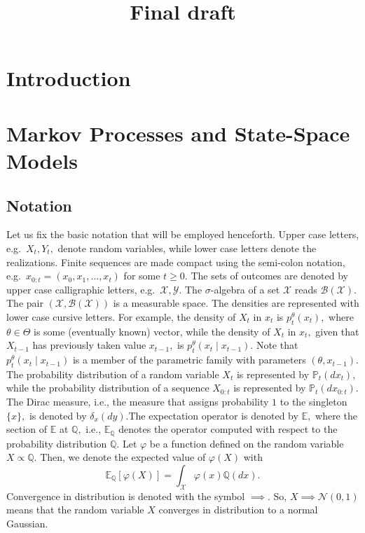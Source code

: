 \documentclass[
]{book}
\title{Final draft}
\author{}
\date{\vspace{-2.5em}}
\theoremstyle{break}
\theoremstyle{nonumberplain}
\begin{document}
\frontmatter
\maketitle

\mainmatter
\chapter*{Introduction}

\chapter{Markov Processes and State-Space Models}
\section{Notation}

Let us fix the basic notation that will be employed henceforth. Upper
case letters, e.g.~\(X_t, Y_t,\) denote random variables, while lower
case letters denote the realizations. Finite sequences are made compact
using the semi-colon notation, e.g.~\(x_{0:t}=(x_0, x_1, \dots, x_t)\)
for some \(t \geq 0.\) The sets of outcomes are denoted by upper case
calligraphic letters, e.g.~\(\mathcal{X}, \mathcal{Y}.\) The
\(\sigma\)-algebra of a set \(\mathcal{X}\) reads
\(\mathcal{B}(\mathcal{X}).\) The pair
\((\mathcal{X}, \mathcal{B}(\mathcal{X}))\) is a measurable space. The
densities are represented with lower case cursive letters. For example,
the density of \(X_t\) in \(x_t\) is \(p_t^\theta(x_t),\) where
\(\theta\in\Theta\) is some (eventually known) vector, while the density
of \(X_t\) in \(x_t,\) given that \(X_{t-1}\) has previously taken value
\(x_{t-1},\) is \(p_t^\theta(x_t\mid x_{t-1}).\) Note that
\(p_t^\theta(x_t\mid x_{t-1})\) is a member of the parametric family
with parameters \((\theta, x_{t-1})\). The probability distribution of a
random variable \(X_t\) is represented by \(\mathbb{P}_t(dx_t),\) while
the probability distribution of a sequence \(X_{0:t}\) is represented by
\(\mathbb{P}_t(dx_{0:t}).\) The Dirac measure, i.e., the measure that
assigns probability \(1\) to the singleton \(\{x\},\) is denoted by
\(\delta_x(dy)\).The expectation operator is denoted by \(\mathbb{E},\)
where the section of \(\mathbb{E}\) at \(\mathbb{Q},\) i.e.,
\(\mathbb{E}_{\mathbb{Q}}\) denotes the operator computed with respect
to the probability distribution \(\mathbb{Q}.\) Let \(\varphi\) be a
function defined on the random variable \(X\propto\mathbb{Q}.\) Then, we
denote the expected value of \(\varphi(X)\) with \[
    \mathbb{E}_{\mathbb{Q}}[\varphi(X)]=
    \int_{\mathcal{X}}\varphi(x)\mathbb{Q}(dx).
\] Convergence in distribution is denoted with the symbol \(\implies.\)
So, \(X\implies\mathcal N(0,1)\) means that the random variable \(X\)
converges in distribution to a normal Gaussian.
\end{document}
